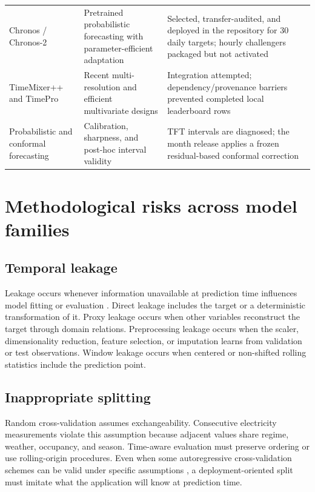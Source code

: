 \begin{longtable}{p{}p{}p{}}
Chronos / Chronos-2 \cite{ansari2024chronos,chronos2repo} & Pretrained probabilistic forecasting with parameter-efficient adaptation & Selected, transfer-audited, and deployed in the repository for 30 daily targets; hourly challengers packaged but not activated \\
TimeMixer++ \cite{wang2025timemixerpp} and TimePro \cite{ma2025timepro} & Recent multi-resolution and efficient multivariate designs & Integration attempted; dependency/provenance barriers prevented completed local leaderboard rows \\
Probabilistic and conformal forecasting \cite{gneiting2014probabilistic,stankeviciute2021conformal} & Calibration, sharpness, and post-hoc interval validity & TFT intervals are diagnosed; the month release applies a frozen residual-based conformal correction \\
\bottomrule
\end{longtable}

\section{Methodological risks across model families}

\subsection{Temporal leakage}

Leakage occurs whenever information unavailable at prediction time influences model fitting or evaluation \cite{kaufman2012leakage}. Direct leakage includes the target or a deterministic transformation of it. Proxy leakage occurs when other variables reconstruct the target through domain relations. Preprocessing leakage occurs when the scaler, dimensionality reduction, feature selection, or imputation learns from validation or test observations. Window leakage occurs when centered or non-shifted rolling statistics include the prediction point.

\subsection{Inappropriate splitting}

Random cross-validation assumes exchangeability. Consecutive electricity measurements violate this assumption because adjacent values share regime, weather, occupancy, and season. Time-aware evaluation must preserve ordering or use rolling-origin procedures. Even when some autoregressive cross-validation schemes can be valid under specific assumptions \cite{bergmeir2018cv}, a deployment-oriented split must imitate what the application will know at prediction time.

